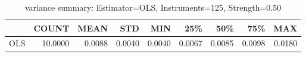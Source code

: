 \begin{table}[ht]
\centering
\caption{variance summary: Estimator=OLS, Instruments=125, Strength=0.50}
\begin{tabular}{lrrrrrrrr}
\toprule
 & COUNT & MEAN & STD & MIN & 25\% & 50\% & 75\% & MAX \\
\midrule
OLS & 10.0000 & 0.0088 & 0.0040 & 0.0040 & 0.0067 & 0.0085 & 0.0098 & 0.0180 \\
\bottomrule
\end{tabular}
\end{table}
